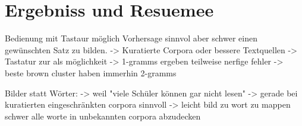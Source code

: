 \section{Ergebniss und Resuemee}
	Bedienung mit Tastaur möglich
    Vorhersage sinnvol aber schwer einen gewünschten Satz zu bilden.
    	-> Kuratierte Corpora oder bessere Textquellen
        -> Tastatur zur als möglichkeit
        -> 1-gramms ergeben teilweise nerfige fehler
        -> beste brown cluster haben immerhin 2-gramms
        
    Bilder statt Wörter:
    	-> weil "viele Schüler können gar nicht lesen"
    	-> gerade bei kuratierten eingeschränkten corpora sinnvoll
        -> leicht bild zu wort zu mappen schwer alle worte in unbekannten corpora abzudecken
        
        
           \newpage